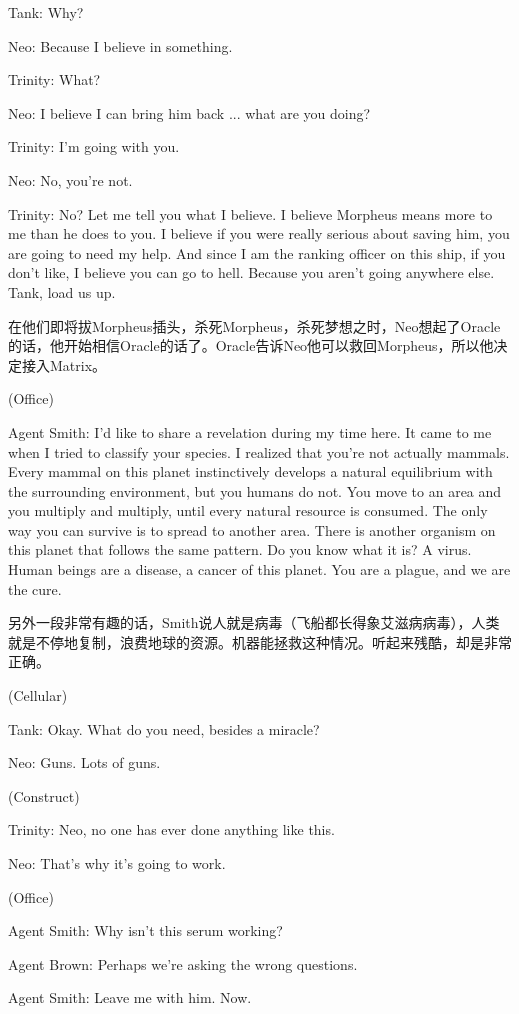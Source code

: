 \documentclass[UTF8]{ctexart}
\newenvironment{myquote}{\color{green} \setlength{\leftskip}{6em} \setlength{\rightskip}{4em} \setlength{\parindent}{-2em}}{\par}
\begin{document}
\begin{myquote}
Tank: Why?

Neo: Because I believe in something.

Trinity: What?

Neo: I believe I can bring him back ... what are you doing?

Trinity: I'm going with you.

Neo: No, you're not.

Trinity: No? Let me tell you what I believe. I believe Morpheus means more to me than he does to you. I believe if you were really serious about saving him, you are going to need my help. And since I am the ranking officer on this ship, if you don't like, I believe you can go to hell. Because you aren't going anywhere else. Tank, load us up.
\end{myquote}

在他们即将拔Morpheus插头，杀死Morpheus，杀死梦想之时，Neo想起了Oracle的话，他开始相信Oracle的话了。Oracle告诉Neo他可以救回Morpheus，所以他决定接入Matrix。

\begin{myquote}
(Office)

Agent Smith: I'd like to share a revelation during my time here. It came to me when I tried to classify your species. I realized that you're not actually mammals. Every mammal on this planet instinctively develops a natural equilibrium with the surrounding environment, but you humans do not. You move to an area and you multiply and multiply, until every natural resource is consumed. The only way you can survive is to spread to another area. There is another organism on this planet that follows the same pattern. Do you know what it is? A virus. Human beings are a disease, a cancer of this planet. You are a plague, and we are the cure.
\end{myquote}

另外一段非常有趣的话，Smith说人就是病毒（飞船都长得象艾滋病病毒），人类就是不停地复制，浪费地球的资源。机器能拯救这种情况。听起来残酷，却是非常正确。

\begin{myquote}
(Cellular)

Tank: Okay. What do you need, besides a miracle?

Neo: Guns. Lots of guns.

(Construct)

Trinity: Neo, no one has ever done anything like this.

Neo: That's why it's going to work.

(Office)

Agent Smith: Why isn't this serum working?

Agent Brown: Perhaps we're asking the wrong questions.

Agent Smith: Leave me with him. Now.
\end{myquote}
\end{document}

